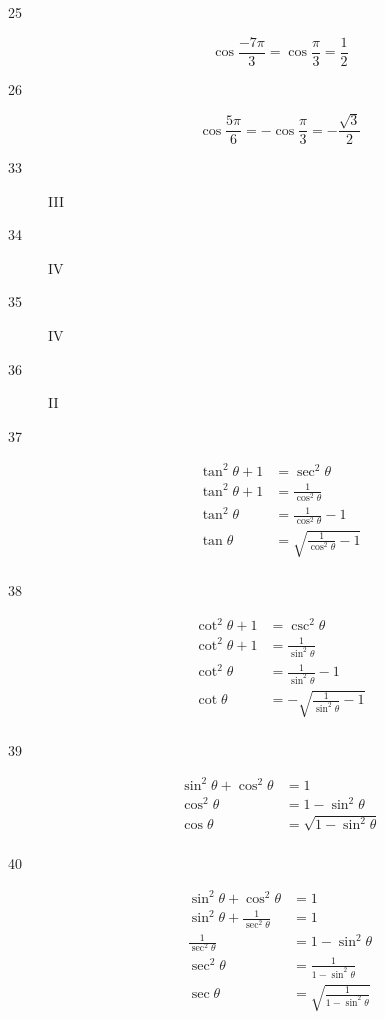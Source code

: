 \documentclass{exam}
\begin{document}
\begin{description}
      \item[25]
        \[
          \cos \frac{-7 \pi}{3} = \cos \frac{\pi}{3} = \boxed{ \frac{1}{2} }
        \]

      \item[26]
        \[
          \cos \frac{5 \pi}{6} = - \cos \frac{\pi}{3} = \boxed{ - \frac{\sqrt{3}}{2} }
        \]

      \item[33] III
      \item[34] IV
      \item[35] IV
      \item[36] II

      \item[37]
        \begin{align*}
          \tan^2 \theta + 1 & = \sec^2 \theta \\
          \tan^2 \theta + 1 & = \frac{1}{\cos^2 \theta} \\
          \tan^2 \theta     & = \frac{1}{\cos^2 \theta} - 1 \\
          \tan \theta       & = \boxed{ \sqrt{\frac{1}{\cos^2 \theta} - 1} } \\
        \end{align*}

      \item[38]
        \begin{align*}
          \cot^2 \theta + 1 & = \csc^2 \theta \\
          \cot^2 \theta + 1 & = \frac{1}{\sin^2 \theta} \\
          \cot^2 \theta     & = \frac{1}{\sin^2 \theta} - 1 \\
          \cot \theta       & = \boxed{ - \sqrt{ \frac{1}{\sin^2 \theta} - 1 } } \\
        \end{align*}

      \item[39]
        \begin{align*}
          \sin^2 \theta + \cos^2 \theta & = 1 \\
          \cos^2 \theta                 & = 1 - \sin^2 \theta \\
          \cos \theta                   & = \boxed{ \sqrt{ 1 - \sin^2 \theta } } \\
        \end{align*}

      \item[40]
        \begin{align*}
          \sin^2 \theta + \cos^2 \theta           & = 1 \\
          \sin^2 \theta + \frac{1}{\sec^2 \theta} & = 1 \\
          \frac{1}{\sec^2 \theta}                 & = 1 - \sin^2 \theta \\
          \sec^2 \theta                           & = \frac{1}{1 - \sin^2 \theta} \\
          \sec \theta                             & = \boxed{ \sqrt{ \frac{1}{1 - \sin^2 \theta} } } \\
        \end{align*}


\end{description}
\end{document}
